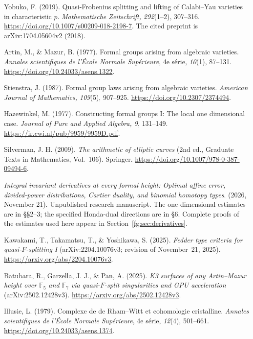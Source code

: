 Yobuko, F. (2019).
Quasi-Frobenius splitting and lifting of Calabi--Yau varieties in
characteristic $p$.
\emph{Mathematische Zeitschrift, 292}(1--2), 307--316.
\url{https://doi.org/10.1007/s00209-018-2198-7}.
The cited preprint is arXiv:1704.05604v2 (2018).

Artin, M., \& Mazur, B. (1977). Formal groups arising from algebraic varieties.
\emph{Annales scientifiques de l'\'Ecole Normale Sup\'erieure}, 4e s\'erie,
\emph{10}(1), 87--131. \url{https://doi.org/10.24033/asens.1322}.

Stienstra, J. (1987). Formal group laws arising from algebraic varieties.
\emph{American Journal of Mathematics, 109}(5), 907--925.
\url{https://doi.org/10.2307/2374494}.

Hazewinkel, M. (1977). Constructing formal groups I: The local one dimensional
case. \emph{Journal of Pure and Applied Algebra, 9}, 131--149.
\url{https://ir.cwi.nl/pub/9959/9959D.pdf}.

Silverman, J. H. (2009). \emph{The arithmetic of elliptic curves}
(2nd ed., Graduate Texts in Mathematics, Vol.~106). Springer.
\url{https://doi.org/10.1007/978-0-387-09494-6}.

\emph{Integral invariant derivatives at every formal height: Optimal affine
error, divided-power distributions, Cartier duality, and binomial homotopy
types}. (2026, November 21). Unpublished research manuscript.
The one-dimensional estimates are in \S\S2--3; the specified Honda-dual
directions are in \S6. Complete proofs of the estimates used here appear
in Section~\ref{fg:sec:derivatives}.

Kawakami, T., Takamatsu, T., \& Yoshikawa, S. (2025).
\emph{Fedder type criteria for quasi-$F$-splitting I}
(arXiv:2204.10076v3; revision of November~21, 2025).
\url{https://arxiv.org/abs/2204.10076v3}.

Batubara, R., Garzella, J. J., \& Pan, A. (2025).
\emph{K3 surfaces of any Artin--Mazur height over $\mathbb F_5$ and
$\mathbb F_7$ via quasi-$F$-split singularities and GPU acceleration}
(arXiv:2502.12428v3).
\url{https://arxiv.org/abs/2502.12428v3}.

Illusie, L. (1979). Complexe de de Rham--Witt et cohomologie cristalline.
\emph{Annales scientifiques de l'\'Ecole Normale Sup\'erieure},
4e s\'erie, \emph{12}(4), 501--661.
\url{https://doi.org/10.24033/asens.1374}.

